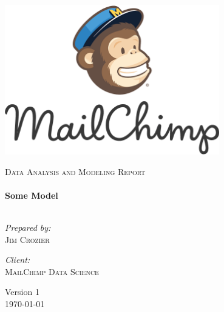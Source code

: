 \begin{titlepage}

\begin{minipage}{0.45\textwidth}
\begin{flushleft}
\includegraphics[width=0.7\textwidth]{./source/shclogo}   
\end{flushleft}
\end{minipage}


\begin{center}




\vspace{4cm}

\textsc{\Large Data Analysis and Modeling Report }\\[0.5cm]


\HRule \\[0.4cm]
{ \huge \bfseries Some Model}\\[0.4cm]

\HRule \\[1.5cm]

\begin{minipage}{0.4\textwidth}
\begin{flushleft} \large
\emph{Prepared by:}\\
\textsc{Jim Crozier}
\end{flushleft}
\end{minipage}
\begin{minipage}{0.4\textwidth}
\begin{flushright} \large
\emph{Client:} \\
\textsc{MailChimp Data Science}
\end{flushright}
\end{minipage}

\vfill

\large {Version 1}\\
{\large \today}

\end{center}

\end{titlepage}